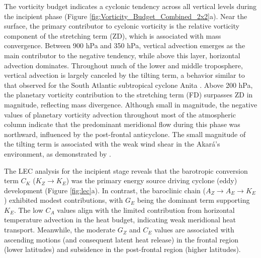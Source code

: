 \documentclass[pdflatex,sn-chicago]{sn-jnl}%
\theoremstyle{plain}
\theoremstyle{definition}
\theoremstyle{remark}
\theoremstyle{definition}
\begin{document}
The vorticity budget indicates a cyclonic tendency across all vertical levels during the incipient phase (Figure \ref{fig:Vorticity_Budget_Combined_2x2}a). Near the surface, the primary contributor to cyclonic vorticity is the relative vorticity component of the stretching term (ZD), which is associated with mass convergence. Between 900 hPa and 350 hPa, vertical advection emerges as the main contributor to the negative tendency, while above this layer, horizontal advection dominates. Throughout much of the lower and middle troposphere, vertical advection is largely canceled by the tilting term, a behavior similar to that observed for the South Atlantic subtropical cyclone Anita \citep{dutra2017structure}. Above 200 hPa, the planetary vorticity contribution to the stretching term (FD) surpasses ZD in magnitude, reflecting mass divergence. Although small in magnitude, the negative values of planetary vorticity advection throughout most of the atmospheric column indicate that the predominant meridional flow during this phase was northward, influenced by the post-frontal anticyclone. The small magnitude of the tilting term is associated with the weak wind shear in the Akará's environment, as demonstrated by \citet{reboita2024assessment}.

The LEC analysis for the incipient stage reveals that the barotropic conversion term $C_K$ ($K_Z \rightarrow K_E$) was the primary energy source driving cyclone (eddy) development (Figure \ref{fig:lec}a). In contrast, the baroclinic chain ($A_Z \rightarrow A_E \rightarrow K_E$) exhibited modest contributions, with $G_E$ being the dominant term supporting $K_E$. The low $C_A$ values align with the limited contribution from horizontal temperature advection in the heat budget, indicating weak meridional heat transport. Meanwhile, the moderate $G_Z$ and $C_E$ values are associated with ascending motions (and consequent latent heat release) in the frontal region (lower latitudes) and subsidence in the post-frontal region (higher latitudes).
\end{document}
